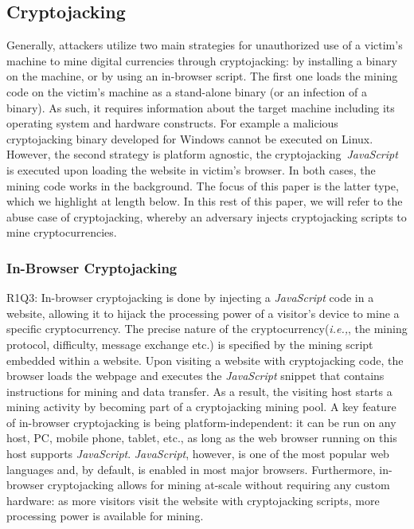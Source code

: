 \documentclass[acmlarge]{acmart}
\newcommand{\vs}[1]{{\vspace{-#1mm}}}
\newcommand{\js}{{\em JavaScript}\xspace}
\newcommand{\etc}{{etc.}\xspace}
\newcommand{\ie}{{\em i.e.,}\xspace}
\newcommand{\cc}{{cryptocurrency}\xspace}
\newcommand{\cj}{cryptojacking\xspace}
\begin{document}
\subsection{Cryptojacking}\label{sec:cj} 
Generally, attackers utilize two main strategies for unauthorized use of a victim's machine to mine digital currencies through \cj:  by installing a binary on the  machine, or by using an in-browser script. The first one loads the mining code on the victim's machine as a stand-alone binary (or an infection of a binary). As such, it requires information about the target machine including its operating system and hardware constructs. For example a malicious \cj binary developed for Windows cannot be executed on Linux. However, the second strategy is platform agnostic, the \cj~\js is executed upon loading the website in victim's browser. In both cases, the mining code works in the background. The focus of this paper is the latter type, which we highlight at length below. In this rest of this paper, we will refer to the abuse case of \cj, whereby an adversary injects \cj scripts to mine cryptocurrencies.%

\vs{0}
\subsubsection{In-Browser Cryptojacking} \label{sec:brcj}
{\color{blue}R1Q3: In-browser \cj is done by injecting a \js code in a website, allowing it to hijack the processing power of a visitor's device to mine a specific \cc. The precise nature of the \cc (\ie, the mining protocol, difficulty, message exchange \etc) is specified by the mining script embedded within a website. Upon visiting a website with \cj code, the browser loads the webpage and executes the \js snippet that contains instructions for mining and data transfer. As a result, the visiting host starts a mining activity by becoming part of a \cj mining pool. A key feature of in-browser \cj is being platform-independent: it can be run on any host, PC, mobile phone, tablet, etc., as long as the web browser running on this host supports \js. \js, however, is one of the most popular web languages and, by default, is enabled in most major browsers. Furthermore, in-browser \cj allows for mining at-scale without requiring any custom hardware: as more visitors visit the website with \cj scripts, more processing power is available for mining. 
}
\end{document}

